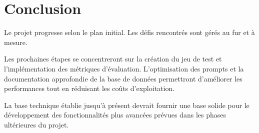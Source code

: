 \documentclass[12pt]{article}
\begin{document}
\section{Conclusion}

Le projet progresse selon le plan initial. Les défis rencontrés sont gérés au fur et à mesure.

Les prochaines étapes se concentreront sur la création du jeu de test et l'implémentation des métriques d'évaluation. L'optimisation des prompts et la documentation approfondie de la base de données permettront d'améliorer les performances tout en réduisant les coûts d'exploitation.

La base technique établie jusqu'à présent devrait fournir une base solide pour le développement des fonctionnalités plus avancées prévues dans les phases ultérieures du projet.
\end{document}
